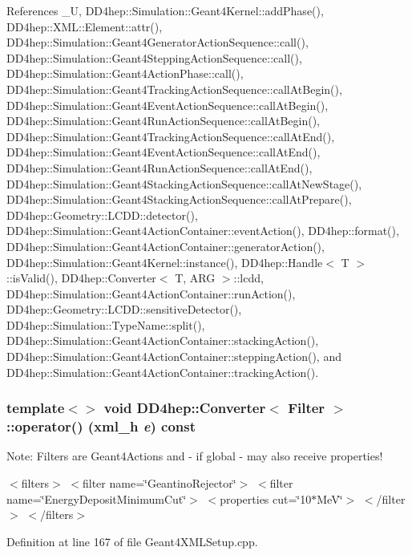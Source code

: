 References \_\-U, DD4hep::Simulation::Geant4Kernel::addPhase(), DD4hep::XML::Element::attr(), DD4hep::Simulation::Geant4GeneratorActionSequence::call(), DD4hep::Simulation::Geant4SteppingActionSequence::call(), DD4hep::Simulation::Geant4ActionPhase::call(), DD4hep::Simulation::Geant4TrackingActionSequence::callAtBegin(), DD4hep::Simulation::Geant4EventActionSequence::callAtBegin(), DD4hep::Simulation::Geant4RunActionSequence::callAtBegin(), DD4hep::Simulation::Geant4TrackingActionSequence::callAtEnd(), DD4hep::Simulation::Geant4EventActionSequence::callAtEnd(), DD4hep::Simulation::Geant4RunActionSequence::callAtEnd(), DD4hep::Simulation::Geant4StackingActionSequence::callAtNewStage(), DD4hep::Simulation::Geant4StackingActionSequence::callAtPrepare(), DD4hep::Geometry::LCDD::detector(), DD4hep::Simulation::Geant4ActionContainer::eventAction(), DD4hep::format(), DD4hep::Simulation::Geant4ActionContainer::generatorAction(), DD4hep::Simulation::Geant4Kernel::instance(), DD4hep::Handle$<$ T $>$::isValid(), DD4hep::Converter$<$ T, ARG $>$::lcdd, DD4hep::Simulation::Geant4ActionContainer::runAction(), DD4hep::Geometry::LCDD::sensitiveDetector(), DD4hep::Simulation::TypeName::split(), DD4hep::Simulation::Geant4ActionContainer::stackingAction(), DD4hep::Simulation::Geant4ActionContainer::steppingAction(), and DD4hep::Simulation::Geant4ActionContainer::trackingAction().\hypertarget{struct_d_d4hep_1_1_converter_a06b7fe862ec6f5f24071fe0173081f3a}{
\subsubsection[{operator()}]{\setlength{\rightskip}{0pt plus 5cm}template$<$$>$ void {\bf DD4hep::Converter}$<$ {\bf Filter} $>$::operator() ({\bf xml\_\-h} {\em e}) const}}
\label{struct_d_d4hep_1_1_converter_a06b7fe862ec6f5f24071fe0173081f3a}
Note: Filters are Geant4Actions and -\/ if global -\/ may also receive properties!

$<$filters$>$ $<$filter name=\char`\"{}GeantinoRejector\char`\"{}$>$ $<$filter name=\char`\"{}EnergyDepositMinimumCut\char`\"{}$>$ $<$properties cut=\char`\"{}10$\ast$MeV\char`\"{}$>$ $<$/filter$>$ $<$/filters$>$ 

Definition at line 167 of file Geant4XMLSetup.cpp.

